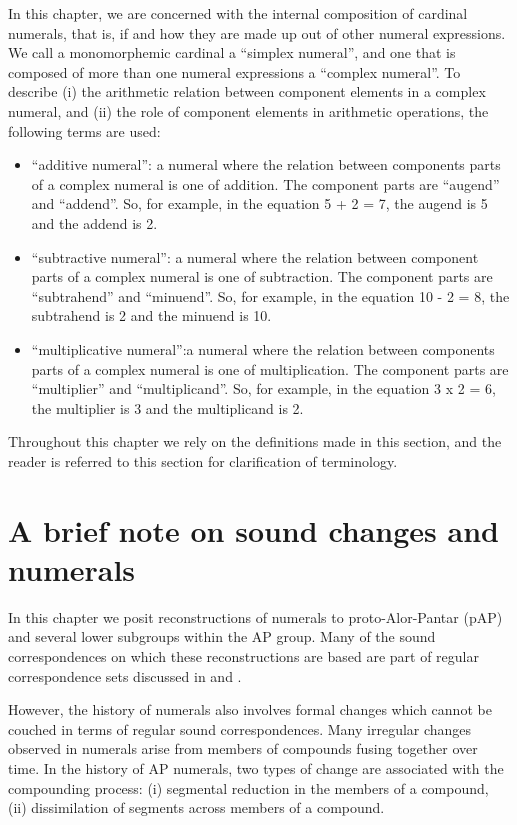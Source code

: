 In this chapter, we are concerned with the internal composition of cardinal numerals, that is, if and how they are made up out of other numeral expressions. We call a monomorphemic cardinal a ``simplex numeral'', and one that is composed of more than one numeral expressions a ``complex numeral''. To describe (i) the arithmetic relation between component elements in a complex numeral, and (ii) the role of component elements in arithmetic operations, the following terms are used:

\begin{itemize}
 \item ``additive numeral'': a numeral where the relation between components parts of a complex numeral is one of addition. The component parts are ``augend'' and ``addend''.  So, for example, in the equation 5 + 2 = 7, the augend is 5 and the addend is 2.
 \item ``subtractive numeral'': a numeral where the relation between component parts of a complex numeral is one of subtraction. The component parts are ``subtrahend'' and ``minuend''. So, for example, in the equation 10 - 2 = 8, the subtrahend is 2 and the minuend is 10.
 \item ``multiplicative numeral'':a numeral where the relation between components parts of a complex numeral is one of multiplication. The component parts are ``multiplier'' and ``multiplicand''.  So, for example, in the equation 3 x 2 = 6, the multiplier is 3 and the multiplicand is 2. 
\end{itemize}
 

Throughout this chapter we rely on the definitions made in this section, and the reader is referred to this section for clarification of terminology.

\section{A brief note on sound changes and numerals}\label{sec:6:3}
In this chapter we posit reconstructions of numerals to proto-Alor-Pantar (pAP) and several lower subgroups within the AP group. Many of the sound correspondences on which these reconstructions are based are part of regular correspondence sets discussed in \citet{HoltonEtAl2012} and \citet{HoltonEtAlTV}. 

  However, the history of numerals also involves formal changes which cannot be couched in terms of regular sound correspondences. Many irregular changes observed in numerals arise from members of compounds fusing together over time. In the history of AP numerals, two  types of change are associated with the compounding process: (i) segmental reduction in the members of a compound, (ii) dissimilation of segments across members of a compound. 

